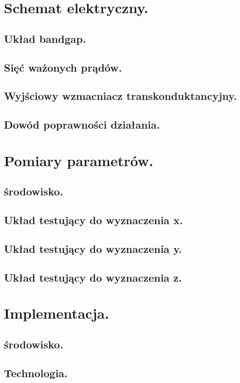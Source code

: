 \documentclass[10pt,a4paper]{report}
\begin{document}
	\chapter{Schemat elektryczny.}
	\section{Układ bandgap.}
	\section{Sięć ważonych prądów.}
	\section{Wyjściowy wzmacniacz transkonduktancyjny.}

	\section{Dowód poprawności działania.}

	\chapter{Pomiary parametrów.}
	\section{środowisko.}
	\section{Układ testujący do wyznaczenia x.}
	\section{Układ testujący do wyznaczenia y.}
	\section{Układ testujący do wyznaczenia z.}
	
	\chapter{Implementacja.}
	\section{środowisko.}
	\section{Technologia.}
\end{document}
